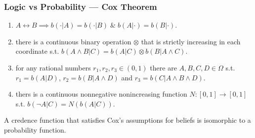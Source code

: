\documentclass[UTF8,11pt,colorlinks,compress,openany]{beamer}%
\begin{document}
\begin{frame}\frametitle{Logic vs Probability --- Cox Theorem}
\begin{center}
\end{center}
\begin{assumption}
\begin{enumerate}
	\item $A\leftrightarrow B\implies b(\cdot|A)=b(\cdot|B)\;\&\;b(A|\cdot)=b(B|\cdot)$.
	\item there is a continuous binary operation $\otimes$ that is strictly increasing in each coordinate s.t. $b(A\wedge B|C)=b(A|C)\otimes b(B|A\wedge C)$.
	\item for any rational numbers $r_1,r_2,r_3\in (0,1)$ there are $A,B,C,D\in\Omega$ s.t. $r_1=b(A|D)$, $r_2=b(B|A\wedge D)$ and $r_3=b(C|A\wedge B\wedge D)$.
	\item thers is a continuous nonnegative nonincreasing function $N: [0,1]\to [0,1]$ s.t. $b(\neg A|C)=N(b(A|C))$.
\end{enumerate}
\end{assumption}
\begin{theorem}
A credence function that satisfies Cox's assumptions for beliefs is isomorphic to a probability function.
\end{theorem}
\end{frame}
\end{document}
